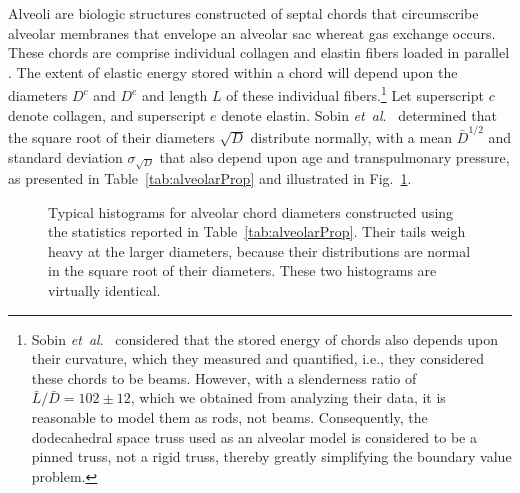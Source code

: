 Alveoli are biologic structures constructed of septal chords that circumscribe alveolar membranes that envelope an alveolar sac whereat gas exchange occurs.  These chords are comprise individual collagen and elastin fibers loaded in parallel \cite{Matsudaetal87,Sobinetal88}.  The extent of elastic energy stored within a chord will depend upon the diameters $D^c$ and $D^e$ and length $L$ of these individual fibers.\footnote{
	Sobin \textit{et~al}.\ \cite{Sobinetal88} considered that the stored energy of chords also depends upon their curvature, which they measured and quantified, i.e., they considered these chords to be beams.  However, with a slenderness ratio of $\bar{L}/\bar{D} = 102 \pm 12$, which we obtained from analyzing their data, it is reasonable to model them as rods, not beams.  Consequently, the dodecahedral space truss used as an alveolar model is considered to be a pinned truss, not a rigid truss, thereby greatly simplifying the boundary value problem.
}
Let superscript $c$ denote collagen, and superscript $e$ denote elastin.  Sobin \textit{et~al}.\ \cite{Sobinetal88} determined that the square root of their diameters $\sqrt{D}$ distribute normally, with a mean $\bar{D}^{1/2}$ and standard deviation $\sigma_{\sqrt{D}}$ that also depend upon age and transpulmonary pressure, as presented in Table~\ref{tab:alveolarProp} and illustrated in Fig.~\ref{fig:septalChordStats}. 

\begin{figure}
    \centering
    \hfill
    \caption{Typical histograms for alveolar chord diameters constructed using the statistics reported in Table~\ref{tab:alveolarProp}.  Their tails weigh heavy at the larger diameters, because their distributions are normal in the square root of their diameters.  These two histograms are virtually identical.}
    \label{fig:septalChordStats}
\end{figure}

